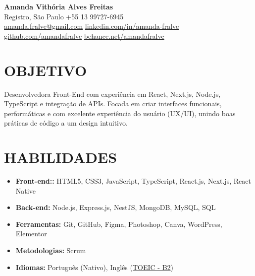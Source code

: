 \documentclass[a4paper,10pt]{article}
\begin{document}
\begin{center}
    {\LARGE \textbf{Amanda Vithória Alves Freitas}}\\[0.1cm]
    Registro, São Paulo \hspace{1mm} {\textbullet} \hspace{1mm} +55 13 99727-6945
    \\[0.2cm] 
    \href{mailto:amanda.fralve@gmail.com}{amanda.fralve@gmail.com}
    \hspace{1mm}{\textbullet}\hspace{1mm}
    \href{https://www.linkedin.com/in/amanda-fralve}{linkedin.com/in/amanda-fralve}
    \hspace{1mm}{\textbullet}\hspace{1mm}
    \href{https://github.com/amandafralve}{github.com/amandafralve}
    \hspace{1mm}{\textbullet}\hspace{1mm}
    \href{https://www.behance.net/amandafralve}{behance.net/amandafralve}
\end{center}



\section{OBJETIVO} 
    Desenvolvedora Front-End com experiência em React, Next.js, Node.js, TypeScript e 
    integração de APIs. Focada em criar interfaces funcionais, performáticas e com excelente 
    experiência do usuário (UX/UI), unindo boas práticas de código a um design intuitivo.


\section{HABILIDADES}
    \begin{itemize}
        \item \textbf{Front-end::} HTML5, CSS3, JavaScript, TypeScript, React.js, Next.js, React Native
        \item \textbf{Back-end:} Node.js, Express.js, NestJS, MongoDB, MySQL, SQL
        \item \textbf{Ferramentas:}  Git, GitHub, Figma, Photoshop, Canva, WordPress, Elementor
        \item \textbf{Metodologias:} Scrum
        \item \textbf{Idiomas:} Português (Nativo), Inglês (\href{https://drive.google.com/file/d/1wQA662aiYXgXoeTkIuQ1UzJLbKcqJmrU/view}{TOEIC - B2})
    \end{itemize}
\end{document}
